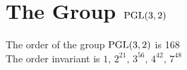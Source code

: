 \section*{The Group ${\rm PGL}(3,2)$}
\noindent The order of the group ${\rm PGL}(3,2)$ is 168\\
The order invariant is $1,\,2^{21},\,3^{56},\,4^{42},\,7^{48}$\\

